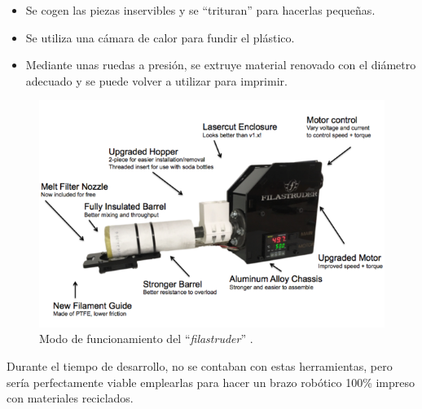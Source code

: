 \begin{itemize}
    \item Se cogen las piezas inservibles y se ``trituran'' para hacerlas pequeñas.
    \item Se utiliza una cámara de calor para fundir el plástico.
    \item Mediante unas ruedas a presión, se extruye material renovado con el
    diámetro adecuado y se puede volver a utilizar para imprimir.
\end{itemize}

\begin{figure}[H]
    \centering
    \includegraphics[width=.9\linewidth]{pictures/filastruder.png}
    \caption{Modo de funcionamiento del ``\textit{filastruder}'' \cite{filastruderFilastruderKit}.}
    \label{fig:filastruder}
\end{figure}

Durante el tiempo de desarrollo, no se contaban con estas herramientas, pero sería
perfectamente viable emplearlas para hacer un brazo robótico 100\% impreso con
materiales reciclados.